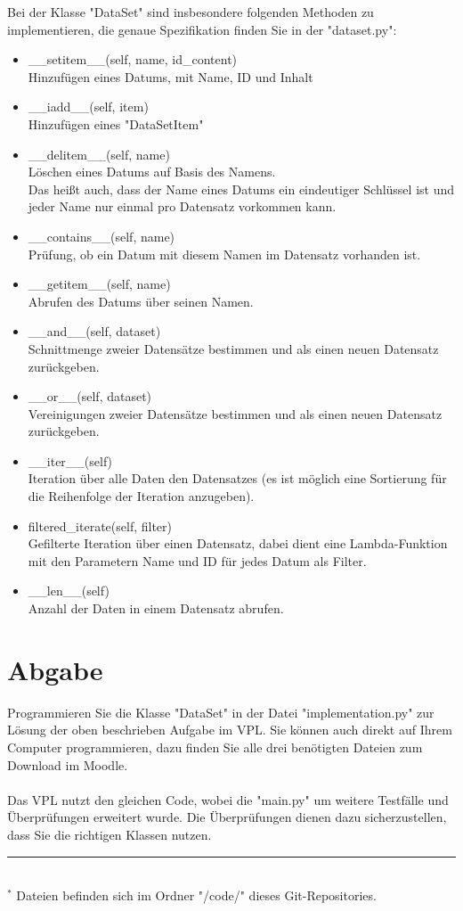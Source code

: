 \documentclass{article}
\begin{document}
			Bei der Klasse "DataSet" sind insbesondere folgenden Methoden zu implementieren, die genaue Spezifikation finden Sie in der "dataset.py":\\
			\begin{itemize}
				\item \_\_setitem\_\_(self, name, id\_content)\\
					Hinzufügen eines Datums, mit Name, ID und Inhalt
				\item \_\_iadd\_\_(self, item)\\
					Hinzufügen eines "DataSetItem"
				\item \_\_delitem\_\_(self, name)\\
					Löschen eines Datums auf Basis des Namens.\\
					Das heißt auch, dass der Name eines Datums ein eindeutiger Schlüssel ist und jeder Name nur einmal pro Datensatz vorkommen kann.
				\item \_\_contains\_\_(self, name)\\
					Prüfung, ob ein Datum mit diesem Namen im Datensatz vorhanden ist.
				\item \_\_getitem\_\_(self, name)\\
					Abrufen des Datums über seinen Namen.
				\item \_\_and\_\_(self, dataset)\\
					Schnittmenge zweier Datensätze bestimmen und als einen neuen Datensatz zurückgeben.
				\item \_\_or\_\_(self, dataset)\\
					Vereinigungen zweier Datensätze bestimmen und als einen neuen Datensatz zurückgeben.
				\item \_\_iter\_\_(self)\\
					Iteration über alle Daten den Datensatzes (es ist möglich eine Sortierung für die Reihenfolge der Iteration anzugeben).
				\item filtered\_iterate(self, filter)\\
					Gefilterte Iteration über einen Datensatz, dabei dient eine Lambda-Funktion mit den Parametern Name und ID für jedes Datum als Filter.
				\item \_\_len\_\_(self)\\
					Anzahl der Daten in einem Datensatz abrufen.\\
			\end{itemize}

		\section{Abgabe}
		Programmieren Sie die Klasse "DataSet" in der Datei "implementation.py" zur Lösung der oben beschrieben Aufgabe im VPL.
		Sie können auch direkt auf Ihrem Computer programmieren, dazu finden Sie alle drei benötigten Dateien zum Download im Moodle.\\
		\\
		Das VPL nutzt den gleichen Code, wobei die "main.py" um weitere Testfälle und Überprüfungen erweitert wurde.
		Die Überprüfungen dienen dazu sicherzustellen, dass Sie die richtigen Klassen nutzen.\\
	
		\hrule\hfill\\[0.2cm]
		$^*$ Dateien befinden sich im Ordner "/code/" dieses Git-Repositories.\\
\end{document}
